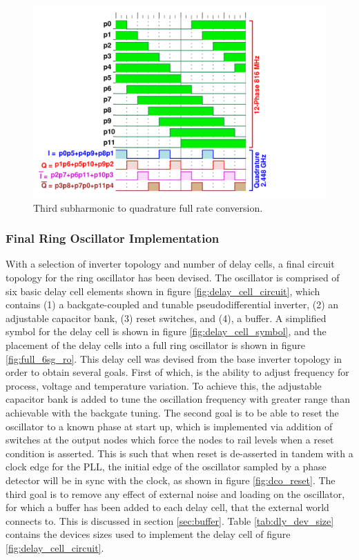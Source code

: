 			\begin{figure}[htb!]
			        \centering
			        \includegraphics[width=1.0\textwidth, angle=0]{./figs/design/ro_12ph_quad}
			    \caption{Third subharmonic to quadrature full rate conversion.}
			    \label{fig:ro_phases}
			\end{figure}


	\subsubsection{Final Ring Oscillator Implementation}
	With a selection of inverter topology and number of delay cells, a final circuit topology for the ring oscillator has been devised. The oscillator is comprised of six basic delay cell elements shown in figure \ref{fig:delay_cell_circuit}, which contains (1) a backgate-coupled and tunable pseudodifferential inverter, (2) an adjustable capacitor bank, (3) reset switches, and (4), a buffer. A simplified symbol for the delay cell is shown in figure \ref{fig:delay_cell_symbol}, and the placement of the delay cells into a full ring oscillator is shown in figure \ref{fig:full_6sg_ro}. This delay cell was devised from the base inverter topology in order to obtain several goals. First of which, is the ability to adjust frequency for process, voltage and temperature variation. To achieve this, the adjustable capacitor bank is added to tune the oscillation frequency with greater range than achievable with the backgate tuning. The second goal is to be able to reset the oscillator to a known phase at start up, which is implemented via addition of switches at the output nodes which force the nodes to rail levels when a reset condition is asserted. This is such that when reset is de-asserted in tandem with a clock edge for the PLL, the initial edge of the oscillator sampled by a phase detector will be in sync with the clock, as shown in figure \ref{fig:dco_reset}. The third goal is to remove any effect of external noise and loading on the oscillator, for which a buffer has been added to each delay cell, that the external world connects to. This is discussed in section \ref{sec:buffer}. Table \ref{tab:dly_dev_size} contains the devices sizes used to implement the delay cell of figure \ref{fig:delay_cell_circuit}.

